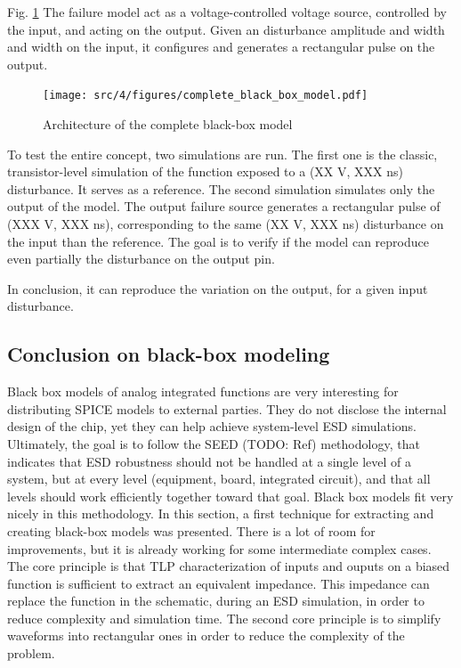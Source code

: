 Fig. \ref{fig:complete-black-box-model}
The failure model act as a voltage-controlled voltage source, controlled by the input, and acting on the output.
Given an disturbance amplitude and width and width on the input, it configures and generates a rectangular pulse on the output.

\begin{figure}[!h]
  \centering
  \texttt{[image: src/4/figures/complete\_black\_box\_model.pdf]}
  \caption{Architecture of the complete black-box model}
  \label{fig:complete-black-box-model}
\end{figure}

To test the entire concept, two simulations are run.
The first one is the classic, transistor-level simulation of the function exposed to a (XX V, XXX ns) disturbance.
It serves as a reference.
The second simulation simulates only the output of the model.
The output failure source generates a rectangular pulse of (XXX V, XXX ns), corresponding to the same (XX V, XXX ns) disturbance on the input than the reference.
The goal is to verify if the model can reproduce even partially the disturbance on the output pin.


In conclusion, it can reproduce the variation on the output, for a given input disturbance.

\subsection{Conclusion on black-box modeling}

Black box models of analog integrated functions are very interesting for distributing SPICE models to external parties.
They do not disclose the internal design of the chip, yet they can help achieve system-level ESD simulations.
Ultimately, the goal is to follow the SEED (TODO: Ref) methodology, that indicates that ESD robustness should not be handled at a single level of a system, but at every level (equipment, board, integrated circuit), and that all levels should work efficiently together toward that goal.
Black box models fit very nicely in this methodology.
In this section, a first technique for extracting and creating black-box models was presented.
There is a lot of room for improvements, but it is already working for some intermediate complex cases.
The core principle is that TLP characterization of inputs and ouputs on a biased function is sufficient to extract an equivalent impedance.
This impedance can replace the function in the schematic, during an ESD simulation, in order to reduce complexity and simulation time.
The second core principle is to simplify waveforms into rectangular ones in order to reduce the complexity of the problem.

